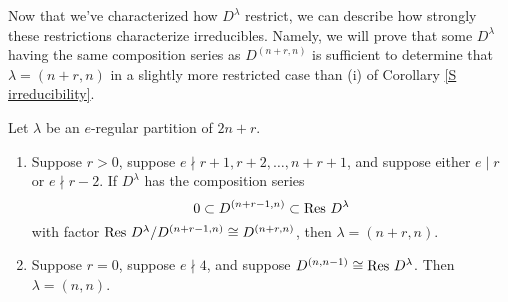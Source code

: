 \documentclass{amsart}
\begin{document}
  Now that we've characterized how $D^\lambda$ restrict, we can describe how strongly these restrictions characterize irreducibles.
  Namely, we will prove that some $D^\lambda$ having the same composition series as  $D^{(n+r,n)}$ is sufficient to determine that $\lambda = (n+r,n)$ in a slightly more restricted case than (i) of Corollary \ref{S irreducibility}.
  \newpage
  \begin{proposition}\label{Combinatorics}
    Let $\lambda$ be an $e$-regular partition of $2n + r$.
    \begin{enumerate}[label={(\roman*)}]
      \item Suppose $r > 0$, suppose $e \nmid r+1, r + 2,\dots,n + r + 1$, and suppose either $e \mid r$ or $e \nmid r-2$.
        If $D^\lambda$ has the composition series 
        \begin{equation}\label{D Composition Series}
          0 \subset D^{(n+r-1,n)} \subset \operatorname{Res} \, D^{\lambda}
        \end{equation}
        with factor $\operatorname{Res} \, D^{\lambda} / D^{(n+r-1,n)} \cong D^{(n+r,n)}$, then $\lambda = (n+r,n)$.
      \item Suppose $r = 0$, suppose $e \nmid 4$, and suppose $D^{(n,n-1)} \cong \operatorname{Res} \, D^\lambda$.
        Then $\lambda = (n,n)$. 
    \end{enumerate}
  \end{proposition}
\end{document}
